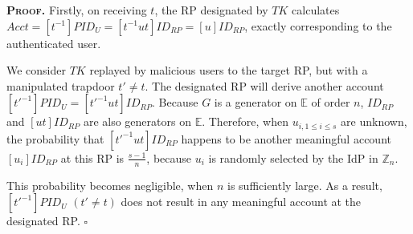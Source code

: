 \noindent\textbf{\textsc{Proof.}}
Firstly, on receiving $t$,
the RP designated by $TK$ calculates $Acct = [t^{-1}]PID_{U} =[t^{-1}ut]ID_{RP} = [u]ID_{RP}$,
    exactly corresponding to the authenticated user.

We consider $TK$ replayed by malicious users to the target RP, but with a manipulated trapdoor $t' \neq t$.
The designated RP will derive another account $[t'^{-1}]PID_U = [t'^{-1}ut]ID_{RP}$.
Because $G$ is a generator on $\mathbb{E}$ of order $n$, $ID_{RP}$ and $[ut]ID_{RP}$ are also generators on $\mathbb{E}$.
Therefore, when $u_{i, 1\leq i \leq s}$ are unknown, the probability that $[t'^{-1}ut]ID_{RP}$ happens to be another meaningful account $[u_i]ID_{RP}$ at this RP is $\frac{s-1}{n}$,
because $u_i$ is randomly selected by the IdP in $\mathbb{Z}_n$.

This probability becomes negligible, when $n$ is sufficiently large.
As a result, $[t'^{-1}]PID_U$ $(t' \neq t)$ does not result in any meaningful account at the designated RP. 
\hfill $\square$




